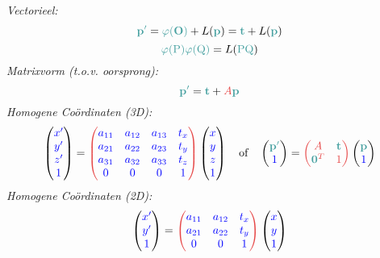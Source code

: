 \documentclass[12pt]{article}
\renewcommand{\vec}[1]{\textcolor{vectorTeal}{\mathbf{#1}}}
\newcommand{\scalar}[1]{\textcolor{scalarBrightBlue}{#1}}
\newcommand{\mat}[1]{\textcolor{matrixSoftRed}{#1}}
\newcommand{\punt}[1]{\mathrm{#1}}
\begin{document}
\textit{Vectorieel:}
\[
\vec{p'} = \vec{\varphi(O)} + L(\vec{p}) = \vec{t} + L(\vec{p})
\]
\[
\vec{\varphi(\punt{P})\varphi(\punt{Q})} = L(\vec{\punt{PQ}})
\]
\textit{Matrixvorm (t.o.v. oorsprong):}
\[
\vec{p'} = \vec{t} + \mat{A} \vec{p}
\]
\textit{Homogene Coördinaten (3D):}
\[
\begin{pmatrix} \scalar{x'} \\ \scalar{y'} \\ \scalar{z'} \\ \scalar{1} \end{pmatrix}
=
\mat{\begin{pmatrix}
\scalar{a_{11}} & \scalar{a_{12}} & \scalar{a_{13}} & \scalar{t_x} \\
\scalar{a_{21}} & \scalar{a_{22}} & \scalar{a_{23}} & \scalar{t_y} \\
\scalar{a_{31}} & \scalar{a_{32}} & \scalar{a_{33}} & \scalar{t_z} \\
\scalar{0} & \scalar{0} & \scalar{0} & \scalar{1}
\end{pmatrix}}
\begin{pmatrix} \scalar{x} \\ \scalar{y} \\ \scalar{z} \\ \scalar{1} \end{pmatrix}
\quad \text{of} \quad
\begin{pmatrix} \vec{p'} \\ \scalar{1} \end{pmatrix} = \mat{\begin{pmatrix} A & \vec{t} \\ \vec{0}^T & 1 \end{pmatrix}} \begin{pmatrix} \vec{p} \\ \scalar{1} \end{pmatrix}
\]
\textit{Homogene Coördinaten (2D):}
\[
\begin{pmatrix} \scalar{x'} \\ \scalar{y'} \\ \scalar{1} \end{pmatrix}
=
\mat{\begin{pmatrix}
\scalar{a_{11}} & \scalar{a_{12}} & \scalar{t_x} \\
\scalar{a_{21}} & \scalar{a_{22}} & \scalar{t_y} \\
\scalar{0} & \scalar{0} & \scalar{1}
\end{pmatrix}}
\begin{pmatrix} \scalar{x} \\ \scalar{y} \\ \scalar{1} \end{pmatrix}
\]
\end{document}

